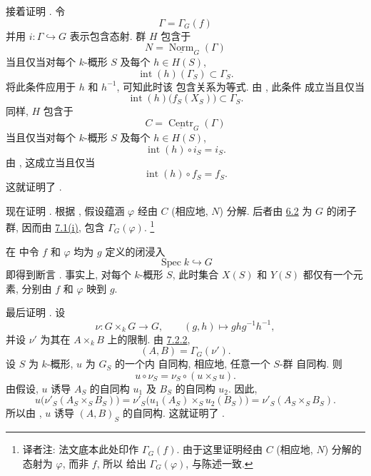 接着证明 \textup{}. 令
\[
  \Gamma=\Gamma_G(f)
\]
并用 \(i:\Gamma\hookrightarrow G\) 表示包含态射.
群 \(H\) 包含于
\[
  N=\underline{\operatorname{Norm}}_G(\Gamma)
\]
当且仅当对每个 \(k\)-概形 \(S\) 及每个
\(h\in H(S)\),
\[
  \operatorname{int}(h)(\Gamma_S)\subset\Gamma_S.
\]
将此条件应用于 \(h\) 和 \(h^{-1}\), 可知此时该
包含关系为等式. 由 \textup{}, 此条件
成立当且仅当
\[
  \operatorname{int}(h)\bigl(f_S(X_S)\bigr)\subset\Gamma_S.
\]
同样, \(H\) 包含于
\[
  C=\underline{\operatorname{Centr}}_G(\Gamma)
\]
当且仅当对每个 \(k\)-概形 \(S\) 及每个
\(h\in H(S)\),
\[
  \operatorname{int}(h)\circ i_S=i_S.
\]
由 \textup{}, 这成立当且仅当
\[
  \operatorname{int}(h)\circ f_S=f_S.
\]
这就证明了 \textup{}.

现在证明 \textup{}. 根据 \textup{},
假设蕴涵 \(\varphi\) 经由 \(C\)
(相应地, \(N\)) 分解. 后者由 \hyperref[prop:sga3-VIB-6.2]{6.2}
为 \(G\) 的闭子群, 因而由
\hyperref[concl:sga3-VIB-7.1-i]{7.1\textup{(i)}}, 包含
\(\Gamma_G(\varphi)\).%
\begingroup
\renewcommand{\thefootnote}{\fnsymbol{footnote}}%
\footnote[1]{\label{note:sga3-VIB-7.3-Gamma-phi}译者注:
法文底本此处印作 \(\Gamma_G(f)\). 由于这里证明经由
\(C\) (相应地, \(N\)) 分解的态射为
\(\varphi\), 而非 \(f\), 所以 \textup{} 给出
\(\Gamma_G(\varphi)\), 与陈述一致.}
\endgroup

在 \textup{} 中令 \(f\) 和 \(\varphi\)
均为 \(g\) 定义的闭浸入
\[
  \operatorname{Spec}k\hookrightarrow G
\]
即得到断言 \textup{}.
事实上, 对每个 \(k\)-概形 \(S\), 此时集合
\(X(S)\) 和 \(Y(S)\) 都仅有一个元素,
分别由 \(f\) 和 \(\varphi\) 映到 \(g\).

最后证明 \textup{}. 设
\[
  \nu:G\times_kG\longrightarrow G,
  \qquad
  (g,h)\longmapsto ghg^{-1}h^{-1},
\]
并设 \(\nu'\) 为其在 \(A\times_kB\) 上的限制. 由
\hyperref[def:sga3-VIB-7.2.2]{7.2.2},
\[
  (A,B)=\Gamma_G(\nu').
\]
设 \(S\) 为 \(k\)-概形, \(u\) 为 \(G_S\) 的一个内
自同构, 相应地, 任意一个 \(S\)-群
自同构. 则
\[
  u\circ\nu_S=\nu_S\circ(u\times_Su).
\]
由假设, \(u\) 诱导 \(A_S\) 的自同构 \(u_1\)
及 \(B_S\) 的自同构 \(u_2\). 因此,
\label{form:sga3-VIB-7.3-v-commutator-image}%
\[
  u\bigl(\nu'_S(A_S\times_SB_S)\bigr)
    =\nu'_S\bigl(u_1(A_S)\times_Su_2(B_S)\bigr)
    =\nu'_S(A_S\times_SB_S).
\]
所以由 \textup{}, \(u\) 诱导
\((A,B)_S\) 的自同构. 这就证明了 \textup{}.


